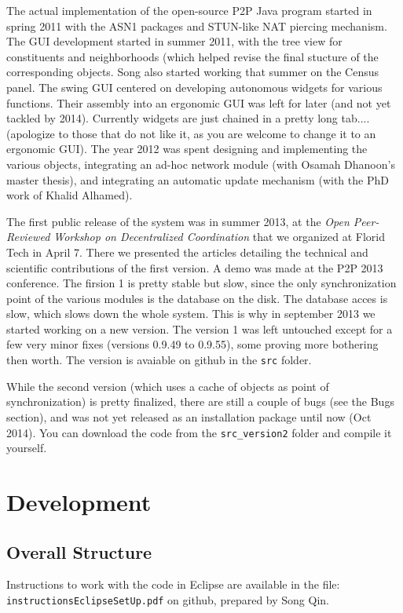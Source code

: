 \documentclass{book}
\begin{document}
The actual implementation of the open-source P2P Java program started in spring 2011 with the ASN1 packages and STUN-like NAT piercing mechanism.  The GUI development
started in summer 2011, with the tree view for constituents and neighborhoods (which helped revise the final stucture of the corresponding objects. Song also started working
that summer on the Census panel. The swing GUI centered on developing autonomous widgets for various functions. Their assembly into an ergonomic GUI was left for
later (and not yet tackled by 2014). Currently widgets are just chained in a pretty long tab.... (apologize to those that do not like it, as you are welcome to change it to an ergonomic GUI).
The year 2012 was spent designing and implementing the various objects, integrating an ad-hoc network module (with Osamah Dhanoon's master thesis), and integrating an automatic update mechanism
(with the PhD work of Khalid Alhamed).

The first public release of the system was in summer 2013, at the {\em Open Peer-Reviewed Workshop on Decentralized Coordination} that we organized at Florid Tech in April 7. There we presented the articles detailing the technical and scientific contributions of the first version. A demo was made at the P2P 2013 conference. The firsion 1 is pretty stable but slow, since the only synchronization
point of the various modules is the database on the disk. The database acces is slow, which slows down the whole system. This is why in september 2013 we started working on a new version.
The version 1 was left untouched except for a few very minor fixes (versions 0.9.49 to 0.9.55), some proving more bothering then worth. The version is avaiable on github in the {\tt src} folder.

While the second version (which uses a cache of objects as point of synchronization) is pretty finalized, there are still a couple of bugs (see the Bugs section), and was not yet released as an installation package until now (Oct 2014). You can download the code from the {\tt src\_version2} folder and compile it yourself.

\chapter{Development}
\section{Overall Structure}

Instructions to work with the code in Eclipse are available in the file: {\tt instructionsEclipseSetUp.pdf} on github, prepared by Song Qin.
\end{document}
